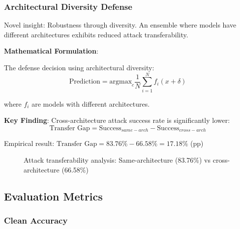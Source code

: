 \documentclass[10pt,conference]{IEEEtran}
\begin{document}
\subsubsection{Architectural Diversity Defense}

Novel insight: Robustness through diversity. An ensemble where models have different architectures exhibits reduced attack transferability.

\textbf{Mathematical Formulation}:

The defense decision using architectural diversity:
\begin{equation}
\text{Prediction} = \text{argmax}_c \frac{1}{N} \sum_{i=1}^{N} f_i(x+\delta)
\label{eq:diversity}
\end{equation}

where $f_i$ are models with different architectures.

\textbf{Key Finding}: Cross-architecture attack success rate is significantly lower:
\begin{equation}
\text{Transfer Gap} = \text{Success}_{same-arch} - \text{Success}_{cross-arch}
\label{eq:gap}
\end{equation}

Empirical result: $\text{Transfer Gap} = 83.76\% - 66.58\% = 17.18\%$ (pp)

\begin{figure}[H]
\centering
{}
\caption{Attack transferability analysis: Same-architecture (83.76\%) vs cross-architecture (66.58\%)}
\label{fig:transfer_analysis}
\end{figure}

\subsection{Evaluation Metrics}

\subsubsection{Clean Accuracy}
\end{document}
